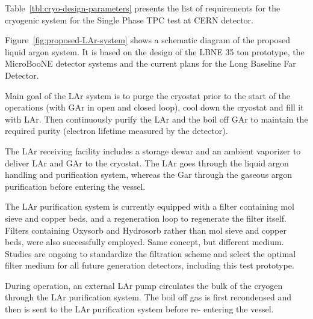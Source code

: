  Table~\ref{tbl:cryo-design-parameters} presents the list of 
requirements for the cryogenic system for the Single Phase TPC test at CERN detector.

Figure~\ref{fig:proposed-LAr-system} shows a schematic diagram of the proposed liquid argon system. It is based on the design of the 
LBNE 35 ton prototype, the MicroBooNE detector systems and the current plans for the Long Baseline Far 
Detector.

Main goal of the LAr system is to purge the cryostat prior to the start of the operations (with GAr in open 
and closed loop), cool down the cryostat and fill it with LAr. Then continuously purify the LAr and the boil 
off GAr to maintain the required purity (electron lifetime measured by the detector).

The LAr receiving facility includes a storage dewar and an ambient vaporizer to deliver LAr and GAr to the 
cryostat. The LAr goes through the liquid argon handling and purification system, whereas the Gar 
through the gaseous argon purification before entering the vessel.

The LAr purification system is currently equipped with a filter containing mol sieve and copper beds, and 
a regeneration loop to regenerate the filter itself. Filters containing Oxysorb and Hydrosorb rather than 
mol sieve and copper beds, were also successfully employed. Same concept, but different medium. 
Studies are ongoing to standardize the filtration scheme and select the optimal filter medium for all 
future generation detectors, including this test prototype. 

During operation, an external LAr pump circulates the bulk of the cryogen through the LAr purification 
system. The boil off gas is first recondensed and then is sent to the LAr purification system before re-
entering the vessel.

